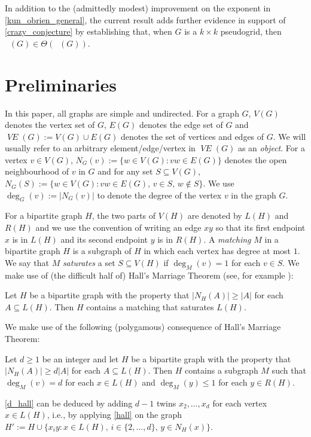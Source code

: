 \documentclass{patmorin}
\newcommand{\defin}[1]{\emph{\color{brightmaroon}#1}}
\DeclareMathOperator{\chicen}{\chi_{\mathrm{cen}}}
\DeclareMathOperator{\chilin}{\chi_{\mathrm{lin}}}
\DeclareMathOperator{\VE}{\mathit{VE}}
\begin{document}
In addition to the (admittedly modest) improvement on the exponent in \cref{kun_obrien_general}, the current result adds further evidence in support of \cref{crazy_conjecture} by establishing that, when $G$ is a $k\times k$ pseudogrid, then $\chicen(G)\in\Theta(\chilin(G))$.

\section{Preliminaries}

In this paper, all graphs are simple and undirected. For a graph $G$, $V(G)$ denotes the vertex set of $G$, $E(G)$ denotes the edge set of $G$ and $\VE(G):=V(G)\cup E(G)$ denotes the set of vertices and edges of $G$. We will usually refer to an arbitrary element/edge/vertex in $\VE(G)$ as an \defin{object}. For a vertex $v\in V(G)$,  $N_G(v):=\{w\in V(G):vw\in E(G)\}$  denotes the open neighbourhood of $v$ in $G$ and for any set $S\subseteq V(G)$, $N_G(S):=\{w\in V(G):vw\in E(G),\, v\in S,\, w\not\in S\}$.  We use $\deg_G(v):=|N_G(v)|$ to denote the degree of the vertex $v$ in the graph $G$.

For a  bipartite graph $H$, the two parts of $V(H)$ are denoted by $L(H)$ and $R(H)$ and we use the convention of writing an edge $xy$ so that its first endpoint $x$ is in $L(H)$ and its second endpoint $y$ is in $R(H)$.  A \defin{matching} $M$ in a bipartite graph $H$ is a subgraph of $H$ in which each vertex has degree at most $1$.  We say that $M$ \defin{saturates} a set $S\subseteq V(H)$ if $\deg_M(v)=1$ for each $v\in S$.  We make use of (the difficult half of) Hall's Marriage Theorem (see, for example \citet[Theorem~2.1.2]{diestel:graph}):

\begin{thm}\label{hall}
  Let $H$ be a bipartite graph with the property that $|N_H(A)|\ge |A|$ for each $A\subseteq L(H)$.  Then $H$ contains a matching that saturates $L(H)$.
\end{thm}

We make use of the following (polygamous) consequence of Hall's Marriage Theorem:
\begin{cor}\label{d_hall}
  Let $d\ge 1$ be an integer and let $H$ be a bipartite graph with the property that $|N_H(A)|\ge d|A|$ for each $A\subseteq L(H)$.  Then $H$ contains a subgraph $M$ such that $\deg_M(v)=d$ for each $x\in L(H)$ and $\deg_M(y)\le 1$ for each $y\in R(H)$.
\end{cor}

\cref{d_hall} can be deduced by adding $d-1$ twins $x_2,\ldots,x_d$ for each vertex $x\in L(H)$, i.e., by applying \cref{hall} on the graph $H':=H\cup\{x_iy:x\in L(H),\, i\in\{2,\ldots,d\},\, y\in N_H(x)\}$.
\end{document}
